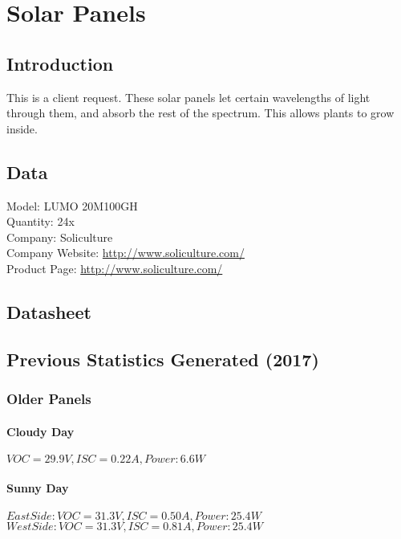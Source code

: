 \section{Solar Panels}
\subsection{Introduction}

This is a client request. These solar panels let certain wavelengths of light through them, and absorb the rest of the spectrum. This allows plants to grow inside.

\subsection{Data}
Model: LUMO 20M100GH \\
Quantity: 24x \\
Company: Soliculture \\
Company Website: \href{http://www.soliculture.com/}{http://www.soliculture.com/} \\
Product Page: \href{http://www.soliculture.com/product/}{http://www.soliculture.com/} \\

\subsection{Datasheet}
\cite{solar}
 
\subsection{Previous Statistics Generated (2017)}
\subsubsection{Older Panels}

\paragraph{Cloudy Day}
$VOC = 29.9V, ISC = 0.22A, Power: 6.6W$
\par

\paragraph{Sunny Day}
$East Side:	VOC = 31.3V, ISC = 0.50A, Power: 25.4W$
$West Side: 	VOC = 31.3V, ISC = 0.81A, Power: 25.4W$
\par

